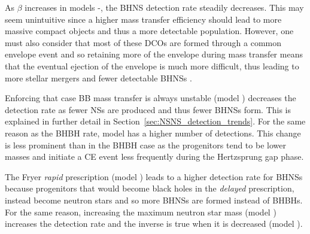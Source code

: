 As $\beta$ increases in models \modBetaLow{}-\modBetaHigh{}, the BHNS detection rate steadily decreases. This may seem unintuitive since a higher mass transfer efficiency should lead to more massive compact objects and thus a more detectable population. However, one must also consider that most of these DCOs are formed through a common envelope event and so retaining more of the envelope during mass transfer means that the eventual ejection of the envelope is much more difficult, thus leading to more stellar mergers and fewer detectable BHNSs \citep[e.g.][]{Kruckow+2018}.


Enforcing that case BB mass transfer is always unstable (model \modCaseBB{}) decreases the detection rate as fewer NSs are produced and thus fewer BHNSs form. This is explained in further detail in Section~\ref{sec:NSNS_detection_trends}. For the same reason as the BHBH rate, model \modOpt{} has a higher number of detections. This change is less prominent than in the BHBH case as the progenitors tend to be lower masses and initiate a CE event less frequently during the Hertzsprung gap phase. 

The Fryer \textit{rapid} prescription (model \modRapid{}) leads to a higher detection rate for BHNSs because progenitors that would become black holes in the \textit{delayed} prescription, instead become neutron stars and so more BHNSs are formed instead of BHBHs. For the same reason, increasing the maximum neutron star mass (model \modNSHigh{}) increases the detection rate and the inverse is true when it is decreased (model \modNSLow{}).

